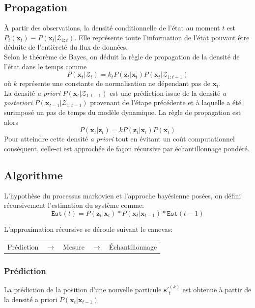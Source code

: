 \documentclass[a4paper,12pt]{report}
\begin{document}
\subsection{Propagation}
\`{A} partir des observations, la densité conditionnelle de l'état au moment $t$ est $P_t(\mathbf{x}_t) \equiv P(\mathbf{x}_t|\mathcal{Z}_ {1:t})$. Elle représente toute l'information de l'état pouvant être déduite de l'entièreté du flux de données.\\
Selon le théorème de Bayes, on déduit la règle de propagation de la densité de l'état dans le temps comme  
$$P(\mathbf{x}_{t}|\mathcal{Z}_{t}) = k_t P(\mathbf{z}_t|\mathbf{x}_t)P(\mathbf{x}_t|\mathcal{Z}_{1:t-1})$$
où $k$ représente une constante de normalisation ne dépendant pas de $\mathbf{x}_t$.\\
La densité \textit{a priori} $P(\mathbf{x}_t|\mathcal{Z}_{1:t-1})$ est une prédiction issue de la densité \textit{a posteriori} $P(\mathbf{x}_{t-1}|\mathcal{Z}_{1:t-1})$ provenant de l'étape précédente et à laquelle a été surimposé un pas de temps du modèle dynamique.
La règle de propagation est alors $$P(\mathbf{x}_t|\mathbf{z}_t) = kP(\mathbf{z}_t|\mathbf{x}_t)P(\mathbf{x}_t)$$
Pour atteindre cette densité \textit{a priori} tout en évitant un coût computationnel conséquent, celle-ci est approchée de façon récursive par échantillonnage pondéré.\\

\subsection{Algorithme}

L'hypothèse du processus markovien et l'approche bayésienne posées, on défini récursivement l'estimation du système comme:
$$\mathtt{Est}(t) = P(\mathbf{z}_{t}|\mathbf{x}_{t})*P(\mathbf{x}_{t}|\mathbf{x}_{t-1})*\mathtt{Est}(t-1)$$

L'approximation récursive se déroule suivant le canevas:
\begin{center}
\begin{tabular}{ c c c c c } 
\cellcolor[gray]{0.9} Prédiction & $\rightarrow$ & \cellcolor[gray]{0.9} Mesure & $\rightarrow$ & \cellcolor[gray]{0.9} Échantillonnage \\  
\end{tabular} 
\end{center}

\subsubsection{Prédiction}
La prédiction de la position d'une nouvelle particule $\mathbf{s'}_{t}^{(k)}$ est obtenue à partir de la densité a priori $P(\mathbf{x}_{t}|\mathbf{x}_{t-1})$ 
\end{document}
